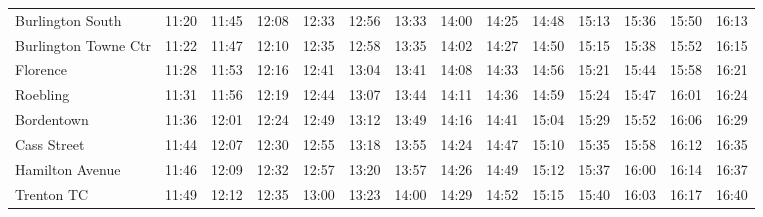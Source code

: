 \begin{center}
\begin{tabular}{@{}lrrrrrrrrrrrrr@{}}
Burlington South & 11:20 & 11:45 & 12:08 & 12:33 & 12:56 & 13:33 & 14:00 & 14:25 & 14:48 & 15:13 & 15:36 & 15:50 & 16:13 \\
Burlington Towne Ctr & 11:22 & 11:47 & 12:10 & 12:35 & 12:58 & 13:35 & 14:02 & 14:27 & 14:50 & 15:15 & 15:38 & 15:52 & 16:15 \\
Florence & 11:28 & 11:53 & 12:16 & 12:41 & 13:04 & 13:41 & 14:08 & 14:33 & 14:56 & 15:21 & 15:44 & 15:58 & 16:21 \\
Roebling & 11:31 & 11:56 & 12:19 & 12:44 & 13:07 & 13:44 & 14:11 & 14:36 & 14:59 & 15:24 & 15:47 & 16:01 & 16:24 \\
Bordentown & 11:36 & 12:01 & 12:24 & 12:49 & 13:12 & 13:49 & 14:16 & 14:41 & 15:04 & 15:29 & 15:52 & 16:06 & 16:29 \\
Cass Street & 11:44 & 12:07 & 12:30 & 12:55 & 13:18 & 13:55 & 14:24 & 14:47 & 15:10 & 15:35 & 15:58 & 16:12 & 16:35 \\
Hamilton Avenue & 11:46 & 12:09 & 12:32 & 12:57 & 13:20 & 13:57 & 14:26 & 14:49 & 15:12 & 15:37 & 16:00 & 16:14 & 16:37 \\
Trenton TC & 11:49 & 12:12 & 12:35 & 13:00 & 13:23 & 14:00 & 14:29 & 14:52 & 15:15 & 15:40 & 16:03 & 16:17 & 16:40 \\
\bottomrule\end{tabular}\end{center}
